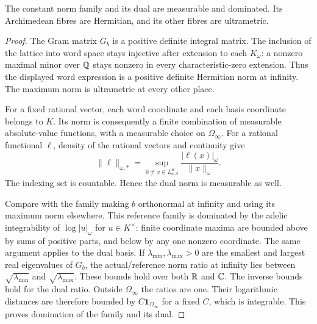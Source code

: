 \begin{lemma}
\label{lem:specht-regularity}
\leanok
The constant norm family and its dual are measurable and dominated.
Its Archimedean fibres are Hermitian, and its other fibres are ultrametric.
\end{lemma}
\begin{proof}
The Gram matrix $G_b$ is a positive definite integral matrix. The inclusion
of the lattice into word space stays injective after extension to each
$K_\omega$: a nonzero maximal minor over $\mathbb Q$ stays nonzero in every
characteristic-zero extension. Thus the displayed word expression is a
positive definite Hermitian norm at infinity. The maximum norm is
ultrametric at every other place.

For a fixed rational vector, each word coordinate and each basis coordinate
belongs to $K$. Its norm is consequently a finite combination of measurable
absolute-value functions, with a measurable choice on $\Omega_\infty$.
For a rational functional $\ell$, density of the rational vectors and
continuity give
\[
 \|\ell\|_{\omega,*}=
 \sup_{0\ne x\in L^S_{a,d}}
       \frac{|\ell(x)|_\omega}{\|x\|_\omega}.
\]
The indexing set is countable. Hence the dual norm is measurable as well.

Compare with the family making $b$ orthonormal at infinity and using its
maximum norm elsewhere. This reference family is dominated by the
adelic integrability of $\log|u|_\omega$ for $u\in K^\times$: finite
coordinate maxima are bounded above by sums of positive parts, and below
by any one nonzero coordinate. The same argument applies to the dual
basis. If $\lambda_{\min},\lambda_{\max}>0$ are the smallest and largest
real eigenvalues of $G_b$, the actual/reference norm ratio at infinity
lies between $\sqrt{\lambda_{\min}}$ and
$\sqrt{\lambda_{\max}}$. These bounds hold over both $\mathbb R$ and $\mathbb C$.
The inverse bounds hold for the dual ratio. Outside $\Omega_\infty$ the
ratios are one. Their logarithmic distances are therefore bounded by
$C\mathbf1_{\Omega_\infty}$ for a fixed $C$, which is integrable.
This proves domination of the family and its dual.
\end{proof}

